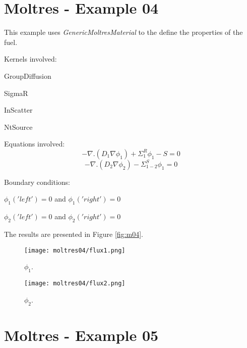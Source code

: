 \documentclass[11pt,letterpaper]{article}
\begin{document}
\newpage
\section{Moltres - Example 04}

This example uses \textit{GenericMoltresMaterial} to the define the properties of the fuel.

Kernels involved:
\begin{description}[font=$\bullet$\scshape\bfseries]
	\item[] GroupDiffusion
	\item[]	SigmaR
	\item[] InScatter
	\item[] NtSource
\end{description}

Equations involved:
\begin{equation}
-\nabla.(D_{1}\nabla\phi_{1})+\Sigma^{R}_{1}\phi_{1}-S=0
\end{equation}
\begin{equation}
-\nabla.(D_{2}\nabla\phi_{2})-\Sigma^{S}_{1-2}\phi_{1}=0
\end{equation}

Boundary conditions:
\begin{description}[]
	\item[] $\phi_{1}('left')=0$ and $\phi_{1}('right')=0$
	\item[] $\phi_{2}('left')=0$ and $\phi_{2}('right')=0$
\end{description}

The results are presented in Figure \ref{fig:m04}.
\begin{figure*}[!h]
	\centering
	\begin{subfigure}[t]{0.4\textwidth}
		\centering
		\texttt{[image: moltres04/flux1.png]} 
		\caption{$\phi_{1}$.}
		\label{fig:m04-flux1}
	\end{subfigure}
	\vspace{1cm}
	\begin{subfigure}[t]{0.4\textwidth}
		\centering
		\texttt{[image: moltres04/flux2.png]} 
		\caption{$\phi_{2}$.}
		\label{fig:m04-flux2}
	\end{subfigure}
	\hfill
	\caption{Flux.}
	\label{fig:m04}
\end{figure*}

\section{Moltres - Example 05}
\end{document}
